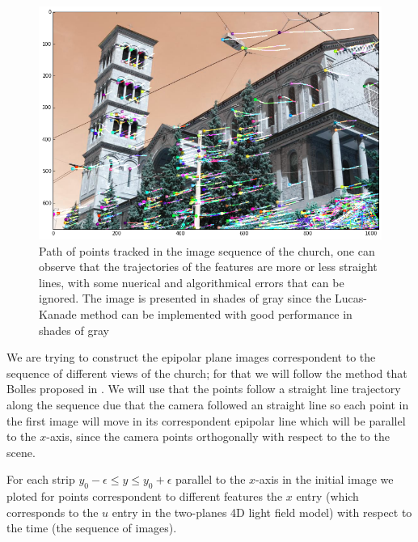 \begin{figure}[h!]
\centering
\includegraphics[width=1\textwidth]{./Diagrams/track_points_church.png}
\caption{Path of points tracked in the image sequence of the church, one can observe that the trajectories of the features are more or less straight lines, with some nuerical and algorithmical errors that can be ignored. The image is presented in shades of gray since the Lucas-Kanade method can be implemented with good performance in shades of gray}
\label{fig:track_points_church}
\end{figure}

\bigskip

We are trying to construct the epipolar plane images correspondent to the sequence of different views of the church; for that we will follow the method that Bolles proposed in \cite{Bolles}. We will use that the points follow a straight line trajectory along the sequence due that the camera followed an straight line so each point in the first image will move in its correspondent epipolar line which will be parallel to the $x$-axis, since the camera points orthogonally with respect to the to the scene. 

\bigskip

For each strip $y_0-\epsilon \leq y \leq y_0+\epsilon$ parallel to the $x$-axis in the initial image we ploted for points correspondent to different features the $x$ entry (which corresponds to the $u$ entry in the two-planes 4D light field model) with respect to the time (the sequence of images).

